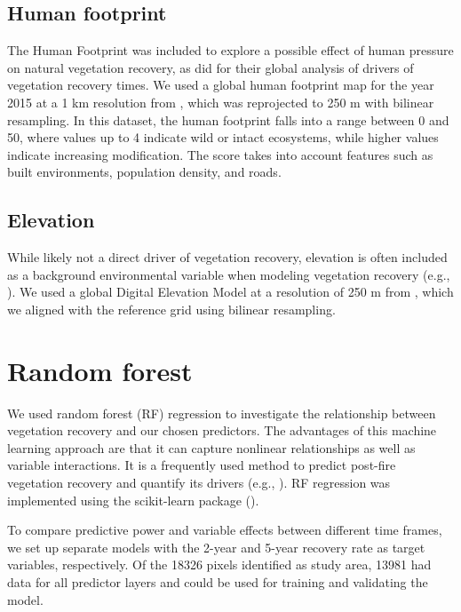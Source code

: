 \documentclass[
  fontsize=12pt,
  paper=a4,
  parskip=half,
  headings=big,
  DIV=12
]{scrreprt}
\begin{document}
\subsection{Human footprint}

The Human Footprint was included to explore a possible effect of human pressure on natural vegetation recovery, as \textcite{xu_global_2024} did for their global analysis of drivers of vegetation recovery times. We used a global human footprint map for the year 2015 at a 1 km resolution from \textcite{mu_global_2022}, which was reprojected to 250 m with bilinear resampling. In this dataset, the human footprint falls into a range between 0 and 50, where values up to 4 indicate wild or intact ecosystems, while higher values indicate increasing modification. The score takes into account features such as built environments, population density, and roads.

\subsection{Elevation}

While likely not a direct driver of vegetation recovery, elevation is often included as a background environmental variable when modeling vegetation recovery (e.g., \cite{xu_global_2024, adagbasa_development_2020}). We used a global Digital Elevation Model at a resolution of 250 m from \textcite{hengl_global_2018}, which we aligned with the reference grid using bilinear resampling.

\section{Random forest}

We used random forest (RF) regression to investigate the relationship between vegetation recovery and our chosen predictors. The advantages of this machine learning approach are that it can capture nonlinear relationships as well as variable interactions. It is a frequently used method to predict post-fire vegetation recovery and quantify its drivers (e.g., \cite{xu_global_2024, adagbasa_development_2020, joao_indicator-based_2018}). RF regression was implemented using the scikit-learn package (\cite{pedregosa_scikit-learn_2011}).

To compare predictive power and variable effects between different time frames, we set up separate models with the 2-year and 5-year recovery rate as target variables, respectively. Of the 18326 pixels identified as study area, 13981 had data for all predictor layers and could be used for training and validating the model.
\end{document}
